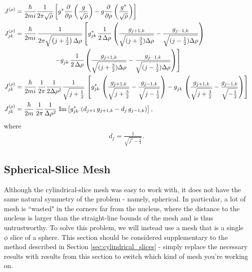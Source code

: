 \documentclass[12pt]{article}
\numberwithin{equation}{section}
\begin{document}
\begin{align*}
J^{(\rho)} &= \frac{\hbar}{2m i} \frac{1}{2\pi \sqrt{\rho}}\left[g^* \pdv{}{\rho}\left(\frac{g}{\sqrt{\rho}}\right) - g \pdv{}{\rho}\left(\frac{g^*}{\sqrt{\rho}}\right) \right] \\
%
J^{(\rho)}_{jk} &= \frac{\hbar}{2mi} \, \frac{1}{2 \pi \sqrt{\left(j+\frac{1}{2}\right) \Delta \rho}} \left[g_{jk}^* \, \frac{1}{2 \, \Delta \rho} \left( \frac{g_{j+1, k}}{\sqrt{(j+\frac{3}{2}) \Delta \rho}} - \frac{g_{j-1, k}}{\sqrt{(j-\frac{1}{2}) \Delta \rho}} \right) \right. \\ &\left. \qquad\qquad\qquad - g_{jk}^{} \, \frac{1}{2 \, \Delta \rho} \left( \frac{g_{j+1, k}}{\sqrt{(j+\frac{3}{2}) \Delta \rho}} - \frac{g_{j-1, k}}{\sqrt{(j-\frac{1}{2}) \Delta \rho}} \right) \right] \\
%
J^{(\rho)}_{jk} &= \frac{\hbar}{2mi} \, \frac{1}{2 \pi} \frac{1}{2 \Delta \rho^2} \frac{1}{\sqrt{j+\frac{1}{2}}} \, \left[g_{jk}^* \, \left( \frac{g_{j+1, k}}{\sqrt{j+\frac{3}{2}}} - \frac{g_{j-1, k}}{\sqrt{j-\frac{1}{2}}} \right) - g_{jk}^{} \, \left( \frac{g_{j+1, k}}{\sqrt{j+\frac{3}{2}}} - \frac{g_{j-1, k}}{\sqrt{-\frac{1}{2}}} \right) \right] \\
%
J^{(\rho)}_{jk} &= \frac{\hbar}{2m} \, \frac{1}{2 \pi} \frac{1}{\Delta \rho^2} \, \operatorname{Im} \left[g_{jk}^* \, \left( d_{j+1} \, g_{j+1, k} - d_j \, g_{j-1, k} \right) \right],
\end{align*}
where
\begin{align*}
d_j = \frac{1}{\sqrt{j^2 - \frac{1}{4}}}.
\end{align*}


\subsection{Spherical-Slice Mesh}\label{sec:spherical_slices}

Although the cylindrical-slice mesh was easy to work with, it does not have the same natural symmetry of the problem - namely, spherical. In particular, a lot of mesh is ``wasted" in the corners far from the nucleus, where the distance to the nucleus is larger than the straight-line bounds of the mesh and is thus untrustworthy. To solve this problem, we will instead use a mesh that is a single $\phi$ slice of a sphere. This section should be considered supplementary to the method described in Section \ref{sec:cylindrical_slices} - simply replace the necessary results with results from this section to switch which kind of mesh you're working on.
\end{document}
